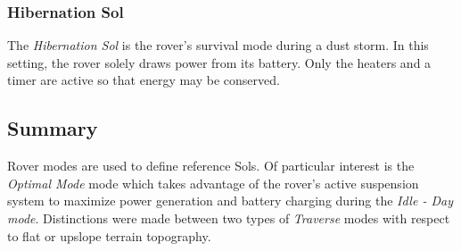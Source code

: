 %

\subsubsection{Hibernation Sol}
\label{sec:ReferenceSols:HibernationSol}
The \textit{Hibernation Sol} is the rover's survival mode during a dust storm. In this setting, the rover solely draws power from its battery. Only the heaters and a timer are active so that energy may be conserved.



\subsection{Summary}
\label{sec:ReferenceSols:SummaryAndConclusion}
Rover modes are used to define reference Sols. Of particular interest is the \textit{Optimal Mode} mode which takes advantage of the rover's active suspension system to maximize power generation and battery charging during the \textit{Idle - Day mode}. Distinctions were made between two types of \textit{Traverse} modes with respect to flat or upslope terrain topography.

